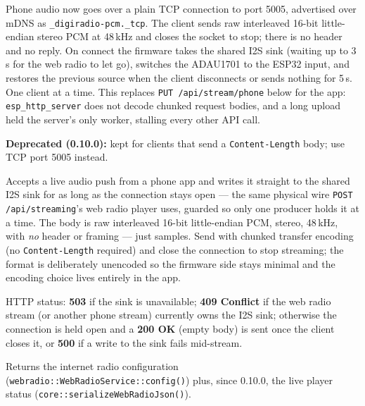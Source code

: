 \label{sec:api-phone-pcm}

Phone audio now goes over a plain TCP connection to port 5005, advertised
over mDNS as \texttt{\_digiradio-pcm.\_tcp}. The client sends raw
interleaved 16-bit little-endian stereo PCM at 48\,kHz and closes the
socket to stop; there is no header and no reply. On connect the firmware
takes the shared I2S sink (waiting up to 3\,s for the web radio to let go),
switches the ADAU1701 to the ESP32 input, and restores the previous source
when the client disconnects or sends nothing for 5\,s. One client at a
time. This replaces \texttt{PUT /api/stream/phone} below for the app:
\texttt{esp\_http\_server} does not decode chunked request bodies, and a
long upload held the server's only worker, stalling every other API call.

\label{sec:api-stream-phone}

\textbf{Deprecated (0.10.0):} kept for clients that send a
\texttt{Content-Length} body; use TCP port 5005 instead.

Accepts a live audio push from a phone app and writes it straight to the
shared I2S sink for as long as the connection stays open --- the same
physical wire \texttt{POST /api/streaming}'s web radio player uses, guarded
so only one producer holds it at a time. The body is raw interleaved
16-bit little-endian PCM, stereo, 48\,kHz, with \emph{no} header or
framing --- just samples. Send with chunked transfer encoding (no
\texttt{Content-Length} required) and close the connection to stop
streaming; the format is deliberately unencoded so the firmware side stays
minimal and the encoding choice lives entirely in the app.

HTTP status: \textbf{503} if the sink is unavailable; \textbf{409 Conflict}
if the web radio stream (or another phone stream) currently owns the I2S
sink; otherwise the connection is held open and a \textbf{200 OK} (empty
body) is sent once the client closes it, or \textbf{500} if a write to the
sink fails mid-stream.

\label{sec:api-streaming-get}

Returns the internet radio configuration
(\texttt{webradio::WebRadioService::config()}) plus, since 0.10.0, the
live player status (\texttt{core::serializeWebRadioJson()}).

